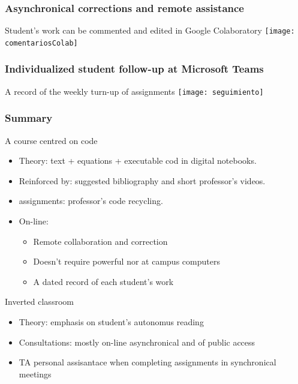 \documentclass[aspectratio=169]{beamer}
\begin{document}
\begin{frame}
	\frametitle{Asynchronical corrections and remote assistance}
	\begin{block}{Student's work can be commented and edited in Google Colaboratory}
		\texttt{[image: comentariosColab]}
	\end{block}
\end{frame}


\begin{frame}
	\frametitle{Individualized student follow-up at Microsoft Teams}
	\begin{block}{A record of the weekly turn-up of assignments}
		\texttt{[image: seguimiento]}
	\end{block}
\end{frame}


\begin{frame}
	\frametitle{Summary}
	\begin{block}{A course centred on code}
		\begin{itemize}[<+->]
			\item Theory: text + equations + executable cod in digital notebooks.
			\item Reinforced by: suggested bibliography and short professor's videos.
			\item assignments: professor's code recycling.
			\item On-line:
			\begin{itemize}[<+->]
				\item Remote collaboration and correction
				\item Doesn't require powerful nor at campus computers
				\item A dated record of each student's work
			\end{itemize}
		\end{itemize}
	\end{block}
	\begin{block}{Inverted classroom}
		\begin{itemize}[<+->]
			\item Theory: emphasis on student's autonomus reading
			\item Consultations: mostly on-line asynchronical and of public access
			\item TA personal assisantace when completing assignments in synchronical meetings
		\end{itemize}
	\end{block}
\end{frame}
	
\end{document}
